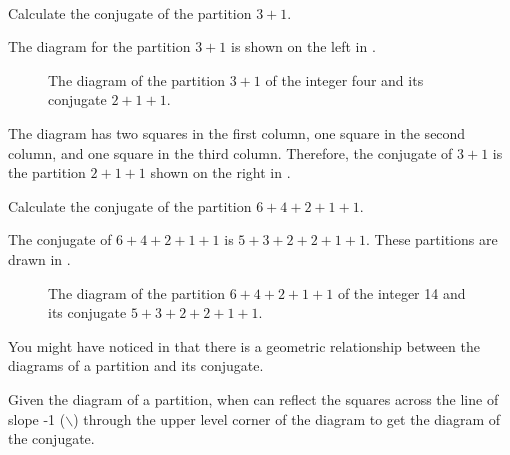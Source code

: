\begin{exam}
\label{exam_conj_partition4and14}
~
    \begin{apart}
        \item Calculate the conjugate of the partition $3+1$.
            \begin{soln}
                The diagram for the partition $3+1$ is shown on the left in .
                    \begin{figure}[hbtp]
                        \centering
                         \hspace{.5in}
                        \caption{The diagram of the partition $3+1$ of the integer four and its conjugate $2+1+1$.}
                        \label{fig_young_31_211}
                    \end{figure}
                The diagram has two squares in the first column, one square in the second column, and one square in the third column. Therefore, the conjugate of $3+1$ is the partition $2+1+1$ shown on the right in .
            \end{soln}
        \item Calculate the conjugate of the partition $6+4+2+1+1$.
            \begin{soln}
                The conjugate of $6+4+2+1+1$ is $5+3+2+2+1+1$. These partitions are drawn in .
                    \begin{figure}[hbtp]
                        \centering
                         \hspace{.5in}
                        \caption{The diagram of the partition $6+4+2+1+1$ of the integer 14 and its conjugate $5+3+2+2+1+1$.}
                        \label{fig_young_64211_532211}
                    \end{figure}            
                \end{soln}
    \end{apart}
\end{exam}

You might have noticed in  that there is a geometric relationship between the diagrams of a partition and its conjugate.

\begin{rem}
\label{rem_conj_partitions_geom}    
   Given the diagram of a partition, when can reflect the squares across the line of slope -1 ($\backslash$) through the upper level corner of the diagram to get the diagram of the conjugate.
\end{rem}

